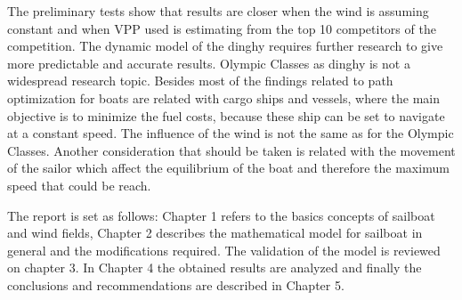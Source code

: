 The preliminary tests show that results are closer when the wind is assuming constant and when VPP used is estimating from the top 10 competitors of the competition. The dynamic model of the dinghy requires further research to give more predictable and accurate results. Olympic Classes as dinghy is not a widespread research topic. Besides most of the findings related to path optimization for boats are related with cargo ships and vessels, where the main objective is to minimize the fuel costs, because these ship can be set to navigate at a constant speed. The influence of the wind is not the same as for the Olympic Classes. Another consideration that should be taken is related with the movement of the sailor which affect the equilibrium of the boat and therefore the maximum speed that could be reach.  %

The report is set as follows: Chapter 1 refers to the basics concepts of sailboat and wind fields, Chapter 2 describes the mathematical model for sailboat in general and the modifications required. The validation of the model is reviewed on chapter 3. In Chapter 4 the obtained results are analyzed and finally the conclusions and recommendations are described in Chapter 5.\par 